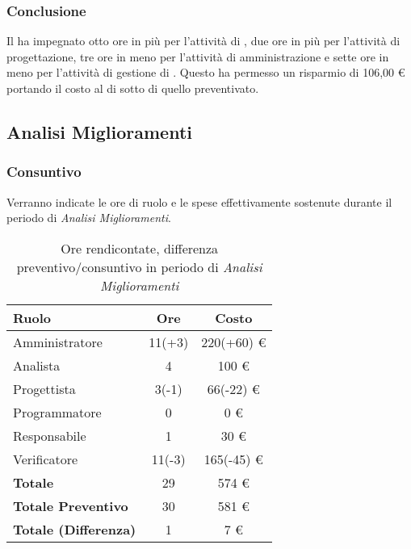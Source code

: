 \subsubsection{Conclusione}
Il  ha impegnato otto ore in pi\`u per l'attivit\`a di , due ore in pi\`u per l'attivit\`a di progettazione, tre ore in meno per l'attivit\`a di amministrazione e sette ore in meno per l'attivit\`a di gestione di . Questo ha permesso un risparmio di 106,00 \euro{} portando il costo  al di sotto di quello preventivato.

\newpage


\subsection{Analisi Miglioramenti}
\subsubsection{Consuntivo}
Verranno indicate le ore di ruolo e le spese effettivamente sostenute durante il periodo di \textit{Analisi Miglioramenti}.

\begin{table}[H]
	\centering
	\begin{tabular}{ l c c }
		\textbf{Ruolo} & \textbf{Ore} & \textbf{Costo} \\
		\hline
		Amministratore & 11(+3) & 220(+60) \euro{} \\
		Analista & 4 & 100 \euro{} \\
		Progettista & 3(-1) & 66(-22) \euro{} \\
		Programmatore & 0 & 0 \euro{} \\
		Responsabile & 1 & 30 \euro{} \\
		Verificatore & 11(-3) & 165(-45) \euro{} \\
		\hline
		\textbf{Totale \glossaryItem{Consuntivo}} & 29 & 574 \euro{} \\
		\hline
		\textbf{Totale Preventivo} & 30 & 581 \euro{} \\
		\hline
		\textbf{Totale (Differenza)} & 1 & 7 \euro{} \\
		\hline
	\end{tabular}
	\caption{Ore rendicontate, differenza preventivo/consuntivo in periodo di \textit{Analisi Miglioramenti}}
\end{table}



